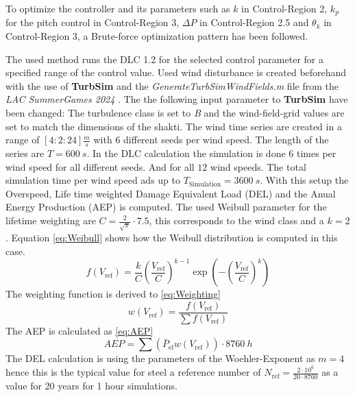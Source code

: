 To optimize the controller and its parameters such as $k$ in Control-Region 2, $k_p$ for the pitch control in Control-Region 3, $\Delta P$ in Control-Region 2.5 and $\theta_k$ in Control-Region 3, a Brute-force optimization pattern has been followed.

The used method runs the DLC 1.2 for the selected control parameter for a specified range of the control value. 
Used wind disturbance is created beforehand with the use of \textbf{TurbSim} and the \textit{GenerateTurbSimWindFields.m} file from the \textit{LAC SummerGames 2024} \cite{SummerGames}. 
The the following input parameter to \textbf{TurbSim} have been changed: The turbulence class is set to \textit{B} and the wind-field-grid values are set to match the dimensions of the \gls{shakti}. 
The wind time series are created in a range of $[4:2:24]\frac{m}{s}$ with $6$ different seeds per wind speed. 
The length of the series are $T = \SI{600}{s}$. 
In the DLC calculation the simulation is done $6$ times per wind speed for all different seeds. And for all $12$ wind speeds. The total simulation time per wind speed ads up to $T_{\text{Simulation}} = \SI{3600}{s}$. 
With this setup the Overspeed, Life time weighted Damage Equivalent Load (DEL) and the Anual Energy Production (AEP) is computed. 
The used Weibull parameter for the lifetime weighting are $C = \frac{2}{\sqrt{\pi}}\cdot7.5$, this corresponds to the wind class \MakeUppercase{} \cite{IEC61400-1} and a $k = 2$. Equation \ref{eq:Weibull} shows how the Weibull distribution is computed in this case.
\begin{equation}
	f(V_{\text{ref}}) = \frac{k}{C}\left(\frac{V_{\text{ref}}}{C}\right)^{k-1} \exp\left(-\left(\frac{V_{\text{ref}}}{C}\right)^k\right)
	\label{eq:Weibull}
\end{equation}
The weighting function is derived to \ref{eq:Weighting}
\begin{equation}
	w(V_{\text{ref}}) = \frac{f(V_{\text{ref}})}{\sum f(V_{\text{ref}})}
	\label{eq:Weighting}
\end{equation}
The AEP is calculated as \ref{eq:AEP}
\begin{equation}
	AEP = \sum \left(\bar{P}_{\text{el}}w(V_{\text{ref}})\right)\cdot \SI{8760}{h}
	\label{eq:AEP}
\end{equation}
The DEL calculation is using the parameters of the Woehler-Exponent as $m = 4$ hence this is the typical value for steel a reference number of $N_{\text{ref}} = \frac{2\cdot10^6}{20\cdot8760}$ as a value for 20 years for 1 hour simulations.

